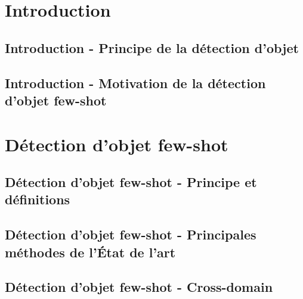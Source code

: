 \documentclass[xcolor=table, 8pt]{beamer}
\begin{document}
    \maketitle
    


    \section{Introduction}\label{sec:od-fsod}

    \subsection{Introduction - Principe de la détection d'objet}\label{subsec:object-detection}
    

    \subsection{Introduction - Motivation de la détection d'objet few-shot}\label{subsec:fs-od-motivation}
    


    \section{Détection d'objet few-shot}\label{sec:fs-od-fsod}

    \subsection{Détection d'objet few-shot - Principe et définitions}\label{subsec:fs-od-definition}
    

    \subsection{Détection d'objet few-shot - Principales méthodes de l'État de l'art}\label{subsec:fs-od-sota}
    

    \subsection{Détection d'objet few-shot - Cross-domain}\label{subsec:fs-od-cd}
    
\end{document}
